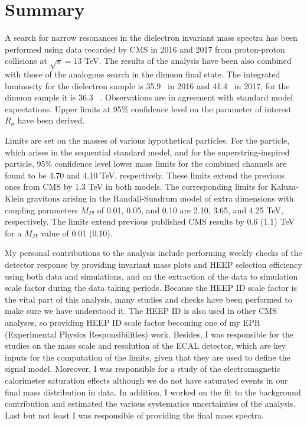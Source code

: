 \clearpage
\section{Summary}
\label{sec:Zprime_summary}


A search for narrow resonances in the dielectron invariant mass spectra has been performed using data recorded by CMS in 2016 and 2017 from proton-proton collisions at $\sqrt{s} = 13$ TeV. The results of the analysis have been also combined with those of the analogous search in the dimuon final state.
The integrated luminosity for the dielectron sample is 35.9 \fbinv\ in 2016 and 41.4 \fbinv\ in 2017, for the dimuon sample it is 36.3 \fbinv\ . Observations are in agreement with standard model expectations. Upper limits at 95\% confidence level on the parameter of interest $R_{\sigma}$ have been derived.

Limits are set on the masses of various hypothetical particles. For the \ZPSSM particle,
which arises in the sequential standard model, and for the superstring-inspired \ZPPSI particle,
95\% confidence level lower mass limits for the combined channels are found to be 4.70
and 4.10 TeV, respectively. These limits extend the previous ones from CMS by 1.3 TeV in
both models. The corresponding limits for Kaluza-Klein gravitons arising in the Randall-Sundrum
model of extra dimensions with coupling parameters $\overline{M}_{Pl}$ of 0.01, 0.05, and 0.10 are 2.10, 3.65, and 4.25 TeV, respectively. The limits extend previous published CMS
results by 0.6 (1.1) TeV for a $\overline{M}_{Pl}$ value of 0.01 (0.10).

My personal contributions to the analysis include performing weekly checks of the detector response by providing invariant mass
plots and HEEP selection efficiency using both data and simulations, and on the extraction of the data to simulation scale factor during the data taking periods. Because the HEEP ID scale factor is the vital part of this analysis, many studies and checks have been performed to make sure we have understood it. The HEEP ID is also used in other CMS analyses, so providing HEEP ID scale factor becoming one of my EPR (Experimental Physics Responsibilities) work.
Besides, I was responsible for the studies on the mass scale and resolution of the ECAL detector, which are key inputs for the computation of the limits, given that they are used to define the signal model. Moreover, I was responsible for a study of the electromagnetic calorimeter saturation effects although we do not have saturated events in our final mass distribution in data. In addition, I worked on the fit to the background contribution and estimated the various systematics uncertainties of the analysis. Last but not least I was responsible of providing the final mass spectra.

